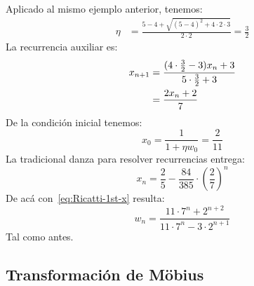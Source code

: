   Aplicado al mismo ejemplo anterior,
  tenemos:
  \begin{align*}
    \eta
      &= \frac{5 - 4 + \sqrt{(5 - 4)^2 + 4 \cdot 2 \cdot 3}}{2 \cdot 2}
       = \frac{3}{2}
  \end{align*}
  La recurrencia auxiliar es:
  \begin{align}
    x_{n + 1}
      &= \frac{(4 \cdot \frac{3}{2} - 3) x_n + 3}
	      {5 \cdot \frac{3}{2} + 3} \notag \\
      &= \frac{2 x_n + 2}{7}
	       \label{eq:Ricatti-ex-1st-aux}
  \end{align}
  De la condición inicial tenemos:
  \begin{equation}
    \label{eq:Ricatti-ex-1st-initial}
    x_0
      = \frac{1}{1 + \eta w_0}
      = \frac{2}{11}
  \end{equation}
  La tradicional danza para resolver recurrencias entrega:
  \begin{equation}
    \label{eq:Ricatti-ex-1st-aux-sol}
    x_n
      = \frac{2}{5} - \frac{84}{385} \cdot \left( \frac{2}{7} \right)^n
  \end{equation}
  De acá con~\eqref{eq:Ricatti-1st-x} resulta:
  \begin{equation}
    \label{eq:Ricatti-ex-1st-sol}
    w_n
      = \frac{11 \cdot 7^n + 2^{n + 2}}{11 \cdot 7^n - 3 \cdot 2^{n + 1}}
  \end{equation}
  Tal como antes.

\subsection{Transformación de Möbius}
\label{sec:Ricatti-Moebius}


